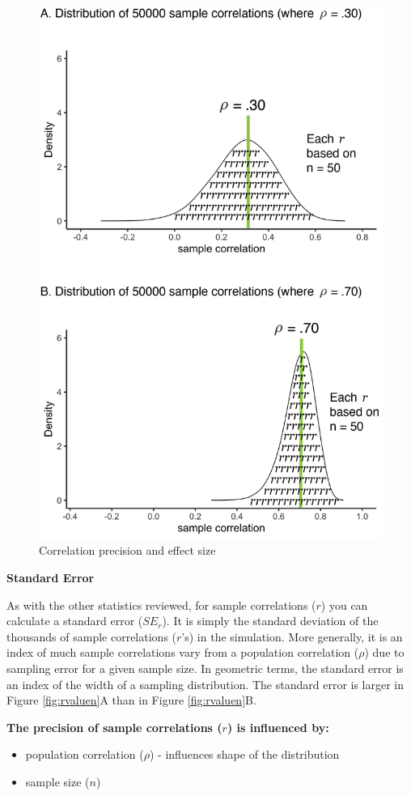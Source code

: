\documentclass[
]{krantz}
\begin{document}
\begin{figure}
\includegraphics[width=0.8\linewidth]{ch_samples_precision/images/r_sampling_dist_rho_vary} \caption{Correlation precision and effect size}\label{fig:rvalueskew}
\end{figure}

\textbf{Standard Error}

As with the other statistics reviewed, for sample correlations (\(r\)) you can calculate a standard error (\(SE_r\)). It is simply the standard deviation of the thousands of sample correlations (\(r\)'s) in the simulation. More generally, it is an index of much sample correlations vary from a population correlation (\(\rho\)) due to sampling error for a given sample size. In geometric terms, the standard error is an index of the width of a sampling distribution. The standard error is larger in Figure \ref{fig:rvaluen}A than in Figure \ref{fig:rvaluen}B.

\textbf{The precision of sample correlations (\(r\)) is influenced by:}

\begin{itemize}
\item
  population correlation (\(\rho\)) - influences shape of the distribution
\item
  sample size (\(n\))
\end{itemize}
\end{document}
